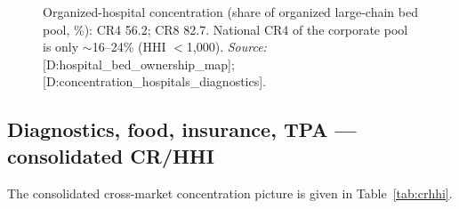 \documentclass[11pt,a4paper]{article}
\newcommand{\cs}[1]{\textnormal{[#1]}}
\begin{document}
\begin{figure}[htbp]
\centering
{}
\caption{Organized-hospital concentration (share of organized large-chain bed pool, \%): CR4 56.2; CR8 82.7. National CR4 of the corporate pool is only $\sim$16--24\% (HHI $<$1{,}000). \textit{Source:} \cs{D:hospital\_bed\_ownership\_map}; \cs{D:concentration\_hospitals\_diagnostics}.}
\label{fig:ch3conc}
\end{figure}

\subsection{Diagnostics, food, insurance, TPA --- consolidated CR/HHI}

The consolidated cross-market concentration picture is given in Table~\ref{tab:crhhi}.
\end{document}
